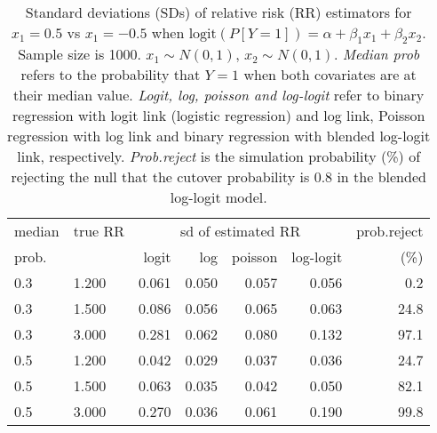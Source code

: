 \documentclass[12pt,a4paper]{article}
\begin{document}
\begin{table}[H] 
\small\sf\centering 
\caption{Standard deviations (SDs) of relative risk (RR) estimators for $x_1=0.5$ vs $x_1=-0.5$ when $\mbox{logit}(P[Y=1])=\alpha+\beta_1 x_1 + \beta_2 x_2$. Sample size is 1000. $x_1 \sim $$N(0,1)$, $x_2 \sim N(0,1)$. {\it Median prob} refers to the probability that $Y=1$ when both covariates are at their median value. {\it Logit, log, poisson and log-logit} refer to binary regression with logit link (logistic regression) and log link, Poisson regression with log link and binary regression with blended log-logit link, respectively. {\it Prob.reject} is the simulation probability (\%) of rejecting the null that the cutover probability is $0.8$ in the blended log-logit model.} 
\begin{tabular}{llrrrrr} 
\toprule 
median & true RR & \multicolumn{4}{c}{sd of estimated RR} & prob.reject \\ 
prob. & & logit & log & poisson & log-logit  & (\%) \\ \midrule 
0.3 & 1.200 & 0.061 & 0.050 & 0.057 & 0.056 &  0.2 \\  
0.3 & 1.500 & 0.086 & 0.056 & 0.065 & 0.063 & 24.8 \\  
0.3 & 3.000 & 0.281 & 0.062 & 0.080 & 0.132 & 97.1 \\  
0.5 & 1.200 & 0.042 & 0.029 & 0.037 & 0.036 & 24.7 \\  
0.5 & 1.500 & 0.063 & 0.035 & 0.042 & 0.050 & 82.1 \\  
0.5 & 3.000 & 0.270 & 0.036 & 0.061 & 0.190 & 99.8 \\  
\bottomrule 
\end{tabular} 
\end{table} 
\end{document}
